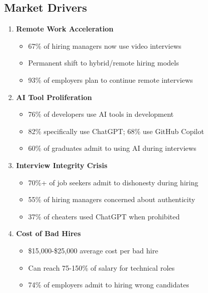 \documentclass[11pt,letterpaper]{article}
\begin{document}
\subsection{Market Drivers}

\begin{enumerate}
    \item \textbf{Remote Work Acceleration}
    \begin{itemize}
        \item 67\% of hiring managers now use video interviews\cite{withe2024}
        \item Permanent shift to hybrid/remote hiring models
        \item 93\% of employers plan to continue remote interviews\cite{adaface2024}
    \end{itemize}

    \item \textbf{AI Tool Proliferation}
    \begin{itemize}
        \item 76\% of developers use AI tools in development\cite{stackoverflow2024}
        \item 82\% specifically use ChatGPT; 68\% use GitHub Copilot\cite{stackoverflow2024}
        \item 60\% of graduates admit to using AI during interviews\cite{handshake2025}
    \end{itemize}

    \item \textbf{Interview Integrity Crisis}
    \begin{itemize}
        \item 70\%+ of job seekers admit to dishonesty during hiring\cite{resumetemplates2024}
        \item 55\% of hiring managers concerned about authenticity\cite{shrm2024}
        \item 37\% of cheaters used ChatGPT when prohibited\cite{resumetemplates2024}
    \end{itemize}

    \item \textbf{Cost of Bad Hires}
    \begin{itemize}
        \item \$15,000-\$25,000 average cost per bad hire\cite{apollotechnical2025}
        \item Can reach 75-150\% of salary for technical roles\cite{careerbuilder2024}
        \item 74\% of employers admit to hiring wrong candidates\cite{businesscom2024}
    \end{itemize}
\end{enumerate}
\end{document}
